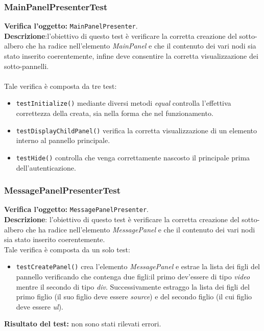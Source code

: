 \subsubsection{MainPanelPresenterTest}
\textbf{Verifica l'oggetto:} \texttt{MainPanelPresenter}.\\
\textbf{Descrizione}:l'obiettivo di questo test è verificare la corretta creazione del sotto-albero che ha radice nell'elemento \textit{MainPanel} e che il contenuto dei vari nodi sia stato inserito coerentemente, infine deve consentire la corretta visualizzazione dei sotto-pannelli.\\\\
Tale verifica è composta da tre test:
\begin{itemize}
\item \texttt{testInitialize()} mediante diversi metodi \textit{equal} controlla l'effettiva correttezza della  creata, sia nella forma che nel funzionamento.
\item \texttt{testDisplayChildPanel()} verifica la corretta visualizzazione di un elemento interno al pannello principale.
\item \texttt{testHide()} controlla che venga correttamente nascosto il  principale prima dell'autenticazione.
\end{itemize}

\subsubsection{MessagePanelPresenterTest}
\textbf{Verifica l'oggetto:} \texttt{MessagePanelPresenter}.\\
\textbf{Descrizione}: l'obiettivo di questo test è verificare la corretta creazione del sotto-albero che ha radice nell'elemento \textit{MessagePanel} e che il contenuto dei vari nodi sia stato inserito coerentemente.\\
Tale verifica è composta da un solo test:
\begin{itemize}
\item \texttt{testCreatePanel()} crea l'elemento \textit{MessagePanel} e estrae la lista dei figli del pannello verificando che contenga due figli:il primo dev'essere di tipo \textit{video} mentre il secondo di tipo \textit{div}.
Successivamente estraggo la lista dei figli del primo figlio (il suo figlio deve essere \textit{source}) e del secondo figlio (il cui figlio deve essere \textit{ul}).
\end{itemize}
\textbf{Risultato del test:} non sono stati rilevati errori.

